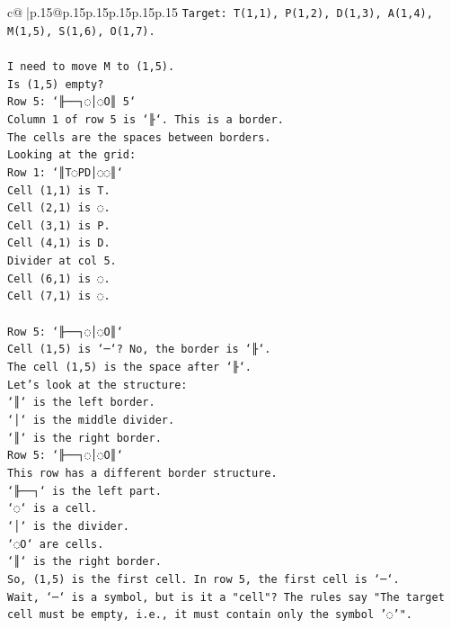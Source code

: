 \documentclass{article}
\begin{document}
{\begin{supertabular}{c@{$\;$}|p{.15\linewidth}@{}p{.15\linewidth}p{.15\linewidth}p{.15\linewidth}p{.15\linewidth}p{.15\linewidth}}
{{{\texttt{Target: T(1,1), P(1,2), D(1,3), A(1,4), M(1,5), S(1,6), O(1,7).} \\
\\ 
\texttt{I need to move M to (1,5).} \\
\texttt{Is (1,5) empty?} \\
\texttt{Row 5: `╟──┐◌│◌O║ 5`} \\
\texttt{Column 1 of row 5 is `╟`. This is a border.} \\
\texttt{The cells are the spaces between borders.} \\
\texttt{Looking at the grid:} \\
\texttt{Row 1: `║T◌PD│◌◌║`} \\
\texttt{Cell (1,1) is T.} \\
\texttt{Cell (2,1) is ◌.} \\
\texttt{Cell (3,1) is P.} \\
\texttt{Cell (4,1) is D.} \\
\texttt{Divider at col 5.} \\
\texttt{Cell (6,1) is ◌.} \\
\texttt{Cell (7,1) is ◌.} \\
\\ 
\texttt{Row 5: `╟──┐◌│◌O║`} \\
\texttt{Cell (1,5) is `─`? No, the border is `╟`.} \\
\texttt{The cell (1,5) is the space after `╟`.} \\
\texttt{Let's look at the structure:} \\
\texttt{`║` is the left border.} \\
\texttt{`│` is the middle divider.} \\
\texttt{`║` is the right border.} \\
\texttt{Row 5: `╟──┐◌│◌O║`} \\
\texttt{This row has a different border structure.} \\
\texttt{`╟──┐` is the left part.} \\
\texttt{`◌` is a cell.} \\
\texttt{`│` is the divider.} \\
\texttt{`◌O` are cells.} \\
\texttt{`║` is the right border.} \\
\texttt{So, (1,5) is the first cell. In row 5, the first cell is `─`.} \\
\texttt{Wait, `─` is a symbol, but is it a "cell"? The rules say "The target cell must be empty, i.e., it must contain only the symbol '◌'".} \\
}}}
\end{supertabular}}
\end{document}
